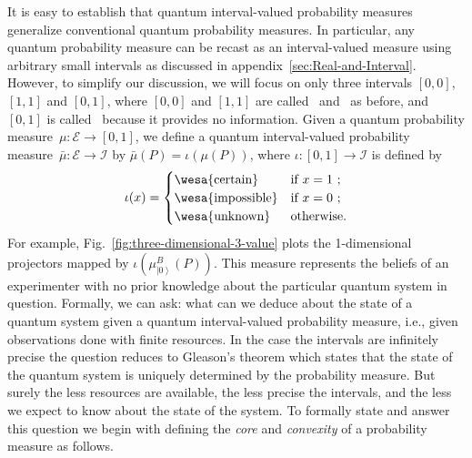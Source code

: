 \documentclass{article}
\theoremstyle{remark}
\newcommand{\events}{\ensuremath{\mathcal{E}}}
\newcommand{\imposs}{{\mbox{\wesa{impossible}}}}
\newcommand{\necess}{{\mbox{\wesa{certain}}}}
\newcommand{\unknown}{{\mbox{\wesa{unknown}}}}
\newcommand{\ket}[1]{{\left\vert{#1}\right\rangle}}
\begin{document}
\noindent It is easy to establish that quantum interval-valued probability
measures generalize conventional quantum probability measures. In
particular, any quantum probability measure can be recast as an interval-valued
measure using arbitrary small intervals as discussed in appendix~\ref{sec:Real-and-Interval}.
However, to simplify our discussion, we will focus on only three intervals
$\left[0,0\right]$, $\left[1,1\right]$ and \emph{$\left[0,1\right]$},
where $\left[0,0\right]$ and $\left[1,1\right]$ are called \imposs~and
\necess~as before, and \emph{$\left[0,1\right]$} is called \unknown~because
it provides no information. Given a quantum probability measure~$\mu:\events\rightarrow\left[0,1\right]$,
we define a quantum interval-valued probability measure~$\bar{\mu}:\events\rightarrow\mathscr{I}$
by $\bar{\mu}(P)=\iota\left(\mu(P)\right)$, where $\iota:\left[0,1\right]\rightarrow\mathscr{I}$
is defined by 
\begin{equation}
\iota(x)=\begin{cases}
\necess & \textrm{if }x=1\textrm{ ;}\\
\imposs & \textrm{if }x=0\textrm{ ;}\\
\unknown & \textrm{otherwise.}
\end{cases}\label{eq:homomorphism}
\end{equation}
For example, Fig.~\ref{fig:three-dimensional-3-value} plots the
1-dimensional projectors mapped by $\iota\left(\mu_{\ket{0}}^{B}(P)\right)$.
This measure represents the beliefs of an experimenter with no prior
knowledge about the particular quantum system in question. Formally,
we can ask: what can we deduce about the state of a quantum system
given a quantum interval-valued probability measure, i.e., given observations
done with finite resources. In the case the intervals are infinitely
precise the question reduces to Gleason's theorem which states that
the state of the quantum system is uniquely determined by the probability
measure. But surely the less resources are available, the less precise
the intervals, and the less we expect to know about the state of the
system. To formally state and answer this question we begin with defining
the \emph{core} and \emph{convexity} of a probability measure as follows.
\end{document}
